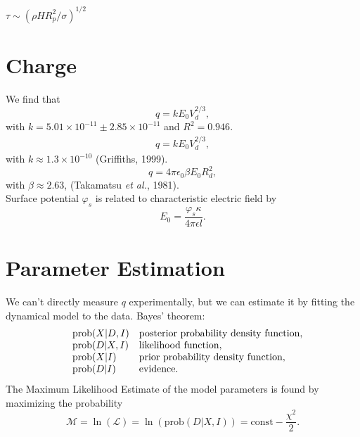 \documentclass[10pt,a4paper]{article}
\begin{document}
$\tau \sim (\rho H R^2_p/\sigma)^{1/2}$

\section*{Charge}
We find that
\[q = k E_0 V_d^{2/3},\] 
with $k=5.01 \times 10^{-11} \pm  2.85 \times 10^{-11}$ and $R^2 = 0.946$.
\\
\begin{eqnarray*}
q = k E_0 V_d^{2/3},
\end{eqnarray*}
with $k \approx 1.3 \times 10^{-10}$ (Griffiths, 1999).
\\
\[q = 4 \pi \epsilon_0 \beta E_0 R_d^2, \]
with $\beta \approx 2.63$, (Takamatsu \emph{et al.}, 1981).
\\
Surface potential $\varphi_s$ is related to characteristic electric field by
\[ E_0  = \frac{\varphi_s \kappa}{4 \pi \epsilon l}. \]

\section*{Parameter Estimation}
We can't directly measure $q$ experimentally, but we can estimate it by fitting the dynamical model to the data. Bayes' theorem:
\[\begin{array}{lll}
& \centering \mbox{prob}(X|D, I) & \mbox{posterior probability density function},\\
& \centering \mbox{prob}(D|X, I) & \mbox{likelihood function},\\
& \centering \mbox{prob}(X|I) &  \mbox{prior probability density function},\\
& \centering \mbox{prob}(D|I) &  \mbox{evidence}.
\end{array}
\]
The Maximum Likelihood Estimate of the model parameters is found by maximizing the probability
\[\mathcal{M} = \ln(\mathcal{L}) = \ln(\mbox{prob}(D|X, I)) = \mbox{const} - \frac{\chi^2}{2}.\]
\end{document}
